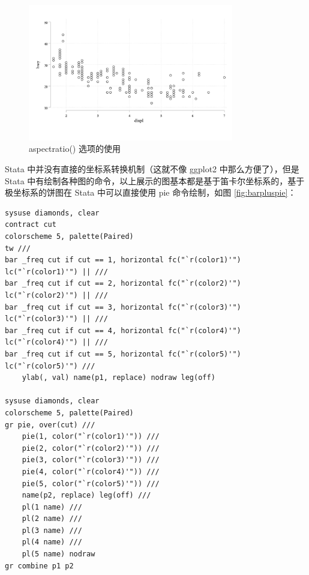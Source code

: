 \documentclass[]{ctexbook}
\begin{document}
\begin{figure}

{\centering \includegraphics[width=0.8\textwidth]{assets/aspscatter} 

}

\caption{aspectratio() 选项的使用}\label{fig:aspscatter}
\end{figure}

Stata 中并没有直接的坐标系转换机制（这就不像 ggplot2 中那么方便了），但是 Stata 中有绘制各种图的命令，以上展示的图基本都是基于笛卡尔坐标系的，基于极坐标系的饼图在 Stata 中可以直接使用 pie 命令绘制，如图 \ref{fig:barpluspie}：

\begin{lstlisting}
sysuse diamonds, clear
contract cut
colorscheme 5, palette(Paired)
tw ///
bar _freq cut if cut == 1, horizontal fc("`r(color1)'") lc("`r(color1)'") || ///
bar _freq cut if cut == 2, horizontal fc("`r(color2)'") lc("`r(color2)'") || ///
bar _freq cut if cut == 3, horizontal fc("`r(color3)'") lc("`r(color3)'") || ///
bar _freq cut if cut == 4, horizontal fc("`r(color4)'") lc("`r(color4)'") || ///
bar _freq cut if cut == 5, horizontal fc("`r(color5)'") lc("`r(color5)'") ///
    ylab(, val) name(p1, replace) nodraw leg(off)

sysuse diamonds, clear
colorscheme 5, palette(Paired)
gr pie, over(cut) ///
    pie(1, color("`r(color1)'")) ///
    pie(2, color("`r(color2)'")) ///
    pie(3, color("`r(color3)'")) ///
    pie(4, color("`r(color4)'")) ///
    pie(5, color("`r(color5)'")) ///
    name(p2, replace) leg(off) ///
    pl(1 name) ///
    pl(2 name) ///
    pl(3 name) ///
    pl(4 name) ///
    pl(5 name) nodraw
gr combine p1 p2
\end{lstlisting}
\end{document}
